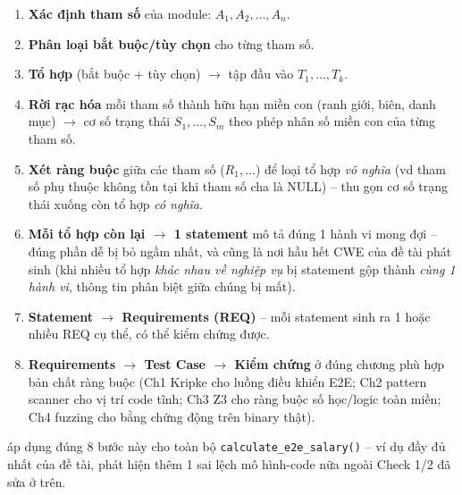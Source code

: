 \begin{enumerate}
  \item \textbf{Xác định tham số} của module: $A_1, A_2, \dots, A_n$.
  \item \textbf{Phân loại bắt buộc/tùy chọn} cho từng tham số.
  \item \textbf{Tổ hợp} (bắt buộc $+$ tùy chọn) $\to$ tập đầu vào $T_1,\dots,T_k$.
  \item \textbf{Rời rạc hóa} mỗi tham số thành hữu hạn miền con (ranh giới, biên, danh mục) $\to$ cơ số trạng thái $S_1,\dots,S_m$ theo phép nhân số miền con của từng tham số.
  \item \textbf{Xét ràng buộc} giữa các tham số ($R_1,\dots$) để loại tổ hợp \emph{vô nghĩa} (vd tham số phụ thuộc không tồn tại khi tham số cha là NULL) -- thu gọn cơ số trạng thái xuống còn tổ hợp \emph{có nghĩa}.
  \item \textbf{Mỗi tổ hợp còn lại $\to$ 1 statement} mô tả đúng 1 hành vi mong đợi -- đúng phần dễ bị bỏ ngầm nhất, và cũng là nơi hầu hết CWE của đề tài phát sinh (khi nhiều tổ hợp \emph{khác nhau về nghiệp vụ} bị statement gộp thành \emph{cùng 1 hành vi}, thông tin phân biệt giữa chúng bị mất).
  \item \textbf{Statement $\to$ Requirements (REQ)} -- mỗi statement sinh ra 1 hoặc nhiều REQ cụ thể, có thể kiểm chứng được.
  \item \textbf{Requirements $\to$ Test Case $\to$ Kiểm chứng} ở đúng chương phù hợp bản chất ràng buộc (Ch1 Kripke cho luồng điều khiển E2E; Ch2 pattern scanner cho vị trí code tĩnh; Ch3 Z3 cho ràng buộc số học/logic toàn miền; Ch4 fuzzing cho bằng chứng động trên binary thật).
\end{enumerate}

 áp dụng đúng 8 bước này cho toàn bộ \texttt{calculate\_e2e\_salary()} -- ví dụ đầy đủ nhất của đề tài, phát hiện thêm 1 sai lệch mô hình-code nữa ngoài Check 1/2 đã sửa ở trên.

